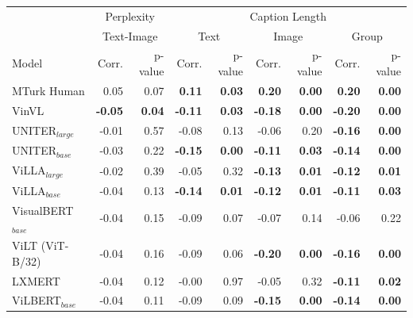 \begin{table}[ht]
\centering
\begin{adjustbox}{max width=\textwidth}
\begin{tabular}{l|rr|rrrrrr}
\toprule
 & \multicolumn{2}{c|}{Perplexity} &  \multicolumn{6}{c}{Caption Length}\\
 & \multicolumn{2}{c|}{Text-Image} &  \multicolumn{2}{c}{Text} &  \multicolumn{2}{c}{Image} &  \multicolumn{2}{c}{Group}\\
 Model      &   Corr. &   p-value & Corr. &   p-value & Corr. &   p-value & Corr. &   p-value\\\midrule 
  MTurk Human                  & 0.05           & 0.07          & \textbf{0.11}  & \textbf{0.03} & \textbf{0.20}  & \textbf{0.00} & \textbf{0.20}  & \textbf{0.00} \\
 VinVL                        & \textbf{-0.05} & \textbf{0.04} & \textbf{-0.11} & \textbf{0.03} & \textbf{-0.18} & \textbf{0.00} & \textbf{-0.20} & \textbf{0.00} \\
 UNITER$_{large}$             & -0.01          & 0.57          & -0.08          & 0.13          & -0.06          & 0.20          & \textbf{-0.16} & \textbf{0.00} \\
 UNITER$_{base}$              & -0.03          & 0.22          & \textbf{-0.15} & \textbf{0.00} & \textbf{-0.11} & \textbf{0.03} & \textbf{-0.14} & \textbf{0.00} \\
 ViLLA$_{large}$              & -0.02          & 0.39          & -0.05          & 0.32          & \textbf{-0.13} & \textbf{0.01} & \textbf{-0.12} & \textbf{0.01} \\
 ViLLA$_{base}$               & -0.04          & 0.13          & \textbf{-0.14} & \textbf{0.01} & \textbf{-0.12} & \textbf{0.01} & \textbf{-0.11} & \textbf{0.03} \\
 VisualBERT$_{base}$          & -0.04          & 0.15          & -0.09          & 0.07          & -0.07          & 0.14          & -0.06          & 0.22          \\
 ViLT (ViT-B/32)              & -0.04          & 0.16          & -0.09          & 0.06          & \textbf{-0.20} & \textbf{0.00} & \textbf{-0.16} & \textbf{0.00} \\
 LXMERT                       & -0.04          & 0.12          & -0.00          & 0.97          & -0.05          & 0.32          & \textbf{-0.11} & \textbf{0.02} \\
 ViLBERT$_{base}$             & -0.04          & 0.11          & -0.09          & 0.09          & \textbf{-0.15} & \textbf{0.00} & \textbf{-0.14} & \textbf{0.00} \\

\end{tabular}
\end{adjustbox}
\end{table}
